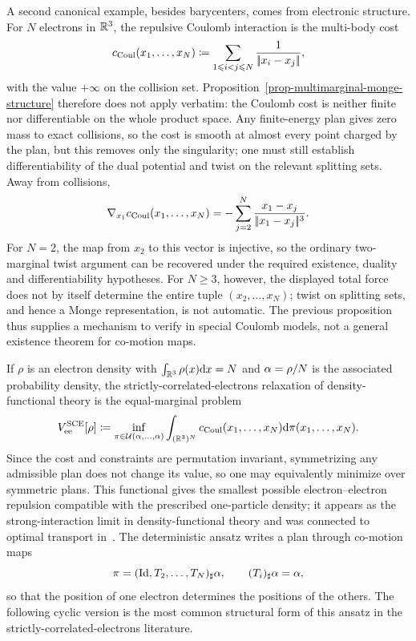 A second canonical example, besides barycenters, comes from electronic structure. For $N$ electrons in $\mathbb{R}^3$, the repulsive Coulomb interaction is the multi-body cost
\[
	c_{\mathrm{Coul}}(x_1,\ldots,x_N)
	\coloneqq
	\sum_{1\leqslant i<j\leqslant N}\frac{1}{|\!| x_i-x_j |\!|},
\]
with the value $+\infty$ on the collision set. Proposition~\ref{prop-multimarginal-monge-structure} therefore does not apply verbatim: the Coulomb cost is neither finite nor differentiable on the whole product space. Any finite-energy plan gives zero mass to exact collisions, so the cost is smooth at almost every point charged by the plan, but this removes only the singularity; one must still establish differentiability of the dual potential and twist on the relevant splitting sets. Away from collisions,
\[
	\nabla_{x_1}c_{\mathrm{Coul}}(x_1,\ldots,x_N)
	=
	-\sum_{j=2}^N\frac{x_1-x_j}{|\!| x_1-x_j |\!|^3}.
\]
For $N=2$, the map from $x_2$ to this vector is injective, so the ordinary two-marginal twist argument can be recovered under the required existence, duality and differentiability hypotheses. For $N\geq3$, however, the displayed total force does not by itself determine the entire tuple $(x_2,\ldots,x_N)$; twist on splitting sets, and hence a Monge representation, is not automatic. The previous proposition thus supplies a mechanism to verify in special Coulomb models, not a general existence theorem for co-motion maps.

If $\rho$ is an electron density with $\int_{\mathbb{R}^3}\rho(x)\mathrm{d} x=N$ and $\alpha=\rho/N$ is the associated probability density, the strictly-correlated-electrons relaxation of density-functional theory is the equal-marginal problem
\[
	V_{\mathrm{ee}}^{\mathrm{SCE}}[\rho]
	\coloneqq
	\inf_{\pi\in\mathcal{U}(\alpha,\ldots,\alpha)}
	\int_{(\mathbb{R}^3)^N}
	c_{\mathrm{Coul}}(x_1,\ldots,x_N)
	\mathrm{d}\pi(x_1,\ldots,x_N).
\]
Since the cost and constraints are permutation invariant, symmetrizing any admissible plan does not change its value, so one may equivalently minimize over symmetric plans. This functional gives the smallest possible electron--electron repulsion compatible with the prescribed one-particle density; it appears as the strong-interaction limit in density-functional theory and was connected to optimal transport in~\cite{GorSeiVig,BuDePGor,CotarDFT,DiMarinoGerolinNennaRepulsiveCosts}. The deterministic ansatz writes a plan through co-motion maps
\[
	\pi=(\mathrm{Id},T_2,\ldots,T_N)_\sharp\alpha,
	\qquad
	(T_i)_\sharp\alpha=\alpha,
\]
so that the position of one electron determines the positions of the others. The following cyclic version is the most common structural form of this ansatz in the strictly-correlated-electrons literature.

